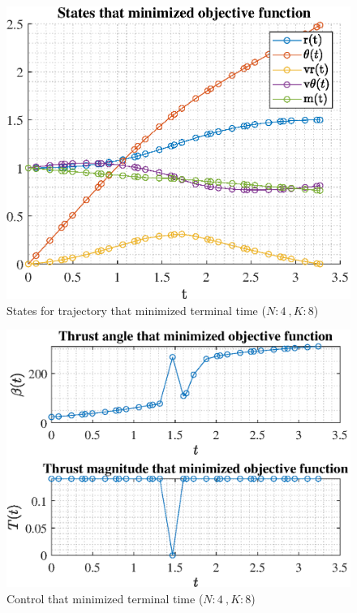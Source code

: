 \documentclass[]{article}
\begin{document}
\begin{figure}
	\centering
	\includegraphics[scale=0.75]{states_N4_K8_C3_tf.eps}
	\caption{States for trajectory that minimized terminal time (\(N:4\ , K:8\))}
	\label{fig:states_N4_K8_C3_tf}
\end{figure}
\begin{figure}
	\centering
	\includegraphics[scale=0.75]{control_N4_K8_C3_tf.eps}
	\caption{Control that minimized terminal time (\(N:4\ , K:8\))}
	\label{fig:control_N4_K8_C3_tf}
\end{figure}
\end{document}
